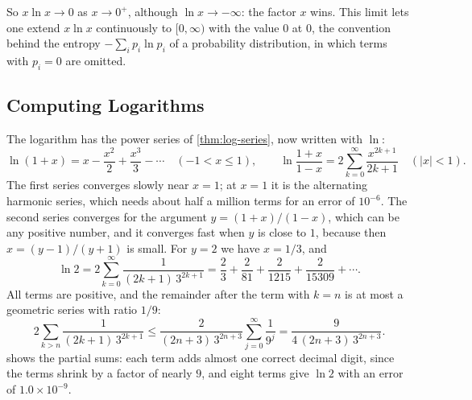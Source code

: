 So $x\ln x\to0$ as $x\to0^+$, although $\ln x\to-\infty$: the factor $x$ wins. This limit lets one extend $x\ln x$ continuously to $[0,\infty)$ with the value $0$ at $0$, the convention behind the entropy $-\sum_ip_i\ln p_i$ of a probability distribution, in which terms with $p_i=0$ are omitted.

\subsection{Computing Logarithms}

The logarithm has the power series of \cref{thm:log-series}, now written with $\ln$:
\[
\ln(1+x)=x-\frac{x^2}2+\frac{x^3}3-\cdots\quad(-1<x\le1),\qquad\ln\frac{1+x}{1-x}=2\sum_{k=0}^\infty\frac{x^{2k+1}}{2k+1}\quad(|x|<1).
\]
The first series converges slowly near $x=1$; at $x=1$ it is the alternating harmonic series, which needs about half a million terms for an error of $10^{-6}$. The second series converges for the argument $y=(1+x)/(1-x)$, which can be any positive number, and it converges fast when $y$ is close to $1$, because then $x=(y-1)/(y+1)$ is small. For $y=2$ we have $x=1/3$, and
\begin{equation}
\ln2=2\sum_{k=0}^\infty\frac1{(2k+1)\,3^{2k+1}}=\frac23+\frac2{81}+\frac2{1215}+\frac2{15309}+\cdots .
\label{eq:ln2-series}
\end{equation}
All terms are positive, and the remainder after the term with $k=n$ is at most a geometric series with ratio $1/9$:
\[
2\sum_{k>n}\frac1{(2k+1)\,3^{2k+1}}\le\frac2{(2n+3)\,3^{2n+3}}\sum_{j=0}^\infty\frac1{9^j}=\frac9{4\,(2n+3)\,3^{2n+3}} .
\]
 shows the partial sums: each term adds almost one correct decimal digit, since the terms shrink by a factor of nearly $9$, and eight terms give $\ln2$ with an error of $1.0\times10^{-9}$.

